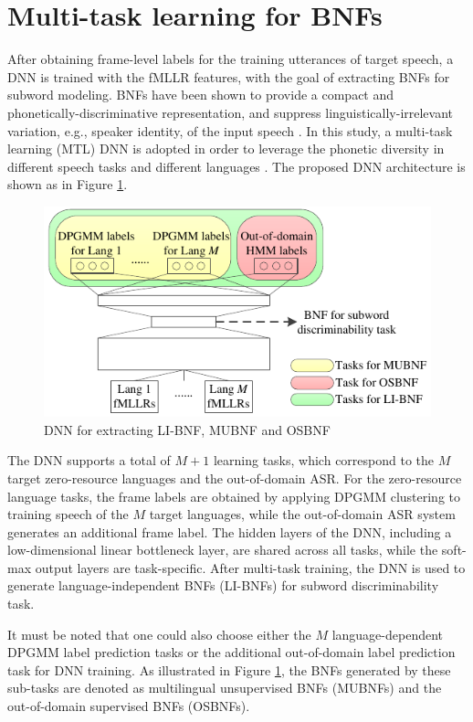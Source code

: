 \documentclass[a4paper]{article}
\begin{document}
\section{Multi-task learning for BNFs}
\label{sec:MTL}
After obtaining frame-level labels for the training utterances of target speech, a DNN is trained with the fMLLR features, with the goal of extracting BNFs for subword modeling. BNFs have been shown to provide a compact and phonetically-discriminative representation, and suppress linguistically-irrelevant variation, e.g., speaker identity, of the input speech \cite{grezl2009investigation}. In this study, a multi-task learning (MTL) DNN is adopted in order to leverage the phonetic diversity in different speech tasks and different languages \cite{caruana1998multitask}. The proposed DNN architecture is shown as in Figure \ref{fig:mtl}.
\begin{figure}[tbp]
\centering
\includegraphics[width = 0.85 \linewidth]{MTL_tnr_embed.pdf}
\caption{DNN for extracting LI-BNF, MUBNF and OSBNF}
\label{fig:mtl}
\end{figure}
The DNN supports a total of $M+1$ learning tasks, which correspond to the $M$ target zero-resource languages and the out-of-domain ASR. For the zero-resource language tasks, the frame labels are obtained by applying DPGMM clustering to training speech of the $M$ target languages, while the out-of-domain ASR system generates an additional frame label. The hidden layers of the DNN, including a low-dimensional linear bottleneck layer, are shared across all tasks, while the soft-max output layers are task-specific. After multi-task training, the DNN is used to generate language-independent BNFs (LI-BNFs) for subword discriminability task.

It must be noted that one could also choose either the $M$ language-dependent DPGMM label prediction tasks or the additional out-of-domain label prediction task for DNN training. As illustrated in Figure \ref{fig:mtl}, the BNFs generated by these sub-tasks are denoted as multilingual unsupervised BNFs (MUBNFs) and the out-of-domain supervised BNFs (OSBNFs).
\end{document}
